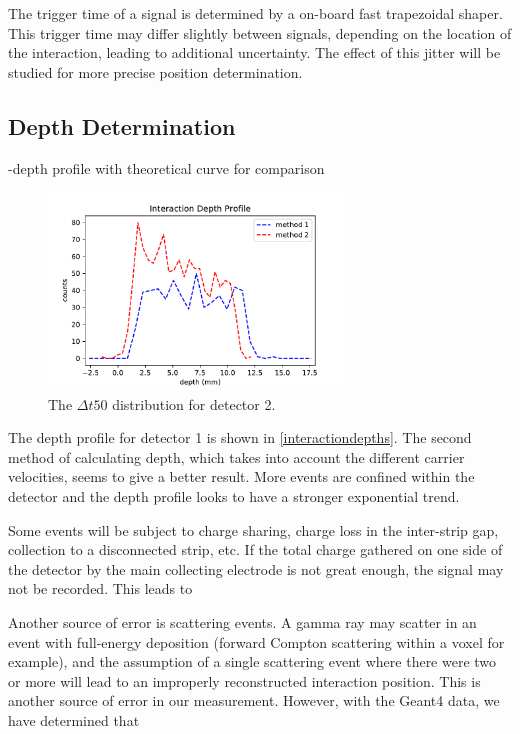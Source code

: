 The trigger time of a signal is determined by a on-board fast trapezoidal shaper. This trigger time may differ slightly between signals, depending on the location of the interaction, leading to additional uncertainty. The effect of this jitter will be studied for more precise position determination.

\subsection*{Depth Determination}

-depth profile with theoretical curve for comparison

\begin{figure}[h]
\begin{centering}
\includegraphics[width=0.7\textwidth]{./figures/interactiondepths.pdf}
\caption{The $\Delta t50$ distribution for detector 2.}
\label{t50_2}
\end{centering}
\end{figure}

The depth profile for detector 1 is shown in \ref{interactiondepths}. The second method of calculating depth, which takes into account the different carrier velocities, seems to give a better result. More events are confined within the detector and the depth profile looks to have a stronger exponential trend.

Some events will be subject to charge sharing, charge loss in the inter-strip gap, collection to a disconnected strip, etc. If the total charge gathered on one side of the detector by the main collecting electrode is not great enough, the signal may not be recorded. This leads to 

Another source of error is scattering events. A gamma ray may scatter in an event with full-energy deposition (forward Compton scattering within a voxel for example), and the assumption of a single scattering event where there were two or more will lead to an improperly reconstructed interaction position. This is another source of error in our measurement. However, with the Geant4 data, we have determined that 

